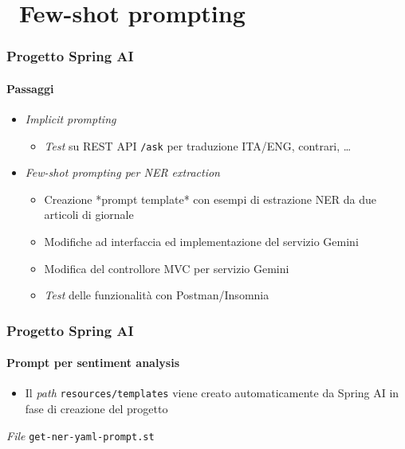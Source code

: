 \section{\faWrench\ Few-shot prompting} %
\label{sec:spring-ai-gemini-few-shot-prompting}
%
\begin{frame}[t,fragile] \frametitle{Progetto Spring AI}
    \framesubtitle{Passaggi}
    {\small
        \begin{itemize}[leftmargin=10pt,align=right]
            \item[\alert{\faArrowCircleRight}] \textit{Implicit prompting}
            \begin{itemize}[leftmargin=10pt,align=right]
                \item[\alertedcircled{1}] \textit{Test} su REST API \texttt{/ask} per traduzione ITA/ENG, contrari, \ldots
            \end{itemize}
            \item[\alert{\faArrowCircleRight}] \textit{\textit{Few-shot prompting} per NER \textit{extraction}}
            \begin{itemize}[leftmargin=10pt,align=right]
                \item[\alertedcircled{1}] Creazione *prompt template* con esempi di estrazione NER da due articoli di giornale
                \item[\alertedcircled{2}] Modifiche ad interfaccia ed implementazione del servizio Gemini
                \item[\alertedcircled{3}] Modifica del controllore MVC per servizio Gemini
                \item[\alertedcircled{4}] \textit{Test} delle funzionalità con Postman/Insomnia 
            \end{itemize}
        \end{itemize}
    }
\end{frame}
%
\begin{frame}[t,fragile] \frametitle{Progetto Spring AI}
    \framesubtitle{Prompt per sentiment analysis}
        \begin{itemize}[leftmargin=10pt,align=right]
		    \item[\alert{\faExclamationTriangle}] Il \textit{path} \texttt{resources/templates} viene creato automaticamente da Spring AI in fase di creazione del progetto
        \end{itemize}
        \begin{block}{\textit{File} \texttt{get-ner-yaml-prompt.st}}
			{\scriptsize}
    	\end{block}
\end{frame}
